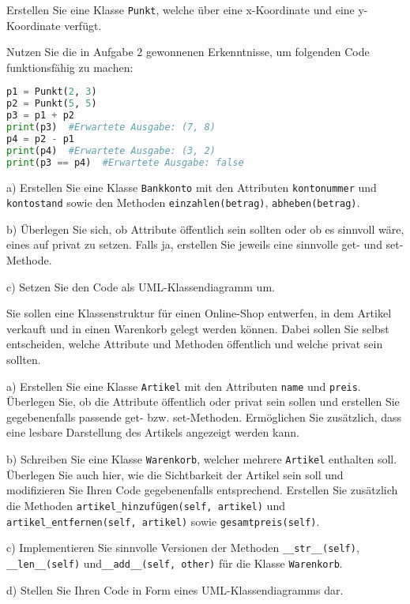 \documentclass[11pt, a4paper, oneside]{article}
\begin{document}
	Erstellen Sie eine Klasse \texttt{Punkt}, welche über eine x-Koordinate und eine y-Koordinate verfügt.
	
	Nutzen Sie die in Aufgabe 2 gewonnenen Erkenntnisse, um folgenden Code funktionsfähig zu machen:
	
	\begin{lstlisting}[language=python]
p1 = Punkt(2, 3)
p2 = Punkt(5, 5)
p3 = p1 + p2
print(p3)  #Erwartete Ausgabe: (7, 8)
p4 = p2 - p1
print(p4)  #Erwartete Ausgabe: (3, 2)
print(p3 == p4)  #Erwartete Ausgabe: false
	\end{lstlisting}

	
	a) Erstellen Sie eine Klasse \texttt{Bankkonto} mit den Attributen \texttt{kontonummer} und \texttt{kontostand} sowie den Methoden \texttt{einzahlen(betrag)}, \texttt{abheben(betrag)}.
	
	b) Überlegen Sie sich, ob Attribute öffentlich sein sollten oder ob es sinnvoll wäre, eines auf privat zu setzen.
	Falls ja, erstellen Sie jeweils eine sinnvolle get- und set-Methode.
	
	c) Setzen Sie den Code als UML-Klassendiagramm um.
	
	
	Sie sollen eine Klassenstruktur für einen Online-Shop entwerfen, in dem Artikel verkauft und in einen Warenkorb gelegt werden können.
	Dabei sollen Sie selbst entscheiden, welche Attribute und Methoden öffentlich und welche privat sein sollten.
	
	a) Erstellen Sie eine Klasse \texttt{Artikel} mit den Attributen \texttt{name} und \texttt{preis}.
	Überlegen Sie, ob die Attribute öffentlich oder privat sein sollen und erstellen Sie gegebenenfalls passende get- bzw. set-Methoden.
	Ermöglichen Sie zusätzlich, dass eine lesbare Darstellung des Artikels angezeigt werden kann.
	
	b) Schreiben Sie eine Klasse \texttt{Warenkorb}, welcher mehrere \texttt{Artikel} enthalten soll.
	Überlegen Sie auch hier, wie die Sichtbarkeit der Artikel sein soll und modifizieren Sie Ihren Code gegebenenfalls entsprechend.
	Erstellen Sie zusätzlich die Methoden \texttt{artikel\_hinzufügen(self, artikel)} und \texttt{artikel\_entfernen(self, artikel)} sowie \texttt{gesamtpreis(self)}.
	
	c) Implementieren Sie sinnvolle Versionen der Methoden \texttt{\_\_str\_\_(self)}, \texttt{\_\_len\_\_(self)} und\linebreak \texttt{\_\_add\_\_(self, other)} für die Klasse \texttt{Warenkorb}.
	
	d) Stellen Sie Ihren Code in Form eines UML-Klassendiagramms dar.
	
\end{document}
